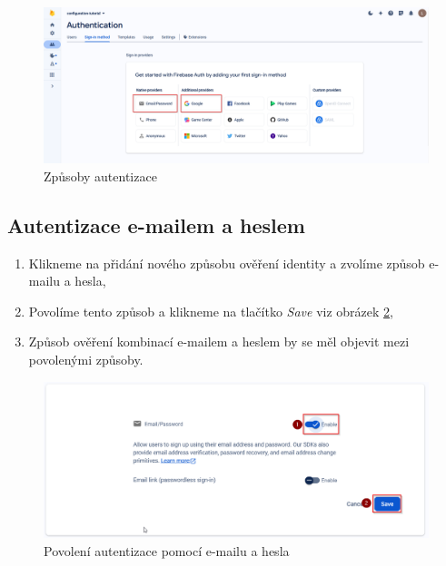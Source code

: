 \documentclass[czech, bc, kiv, he, iso690numb]{fasthesis}
\begin{document}
\begin{figure}[h!]
  \centering
  \includegraphics[width=1\textwidth]{img/BP-Runt/firebase-configuration/firebase-auth-providers.png}
  \caption{Způsoby autentizace}
  \label{fig:auth-providers}
\end{figure}

\subsection{Autentizace e-mailem a heslem}

\begin{enumerate}[label=\arabic*.]
    \item Klikneme na přidání nového způsobu ověření identity a zvolíme způsob e-mailu a hesla,
    \item Povolíme tento způsob a klikneme na tlačítko \textit{Save} viz obrázek \ref{fig:email-and-password},
    \item Způsob ověření kombinací e-mailem a heslem by se měl objevit mezi povolenými způsoby.
\end{enumerate}

\begin{figure}[h!]
  \centering
  \includegraphics[width=1\textwidth]{img/BP-Runt/firebase-configuration/auth-email-and-password.png}
  \caption{Povolení autentizace pomocí e-mailu a hesla}
  \label{fig:email-and-password}
\end{figure}
\end{document}
